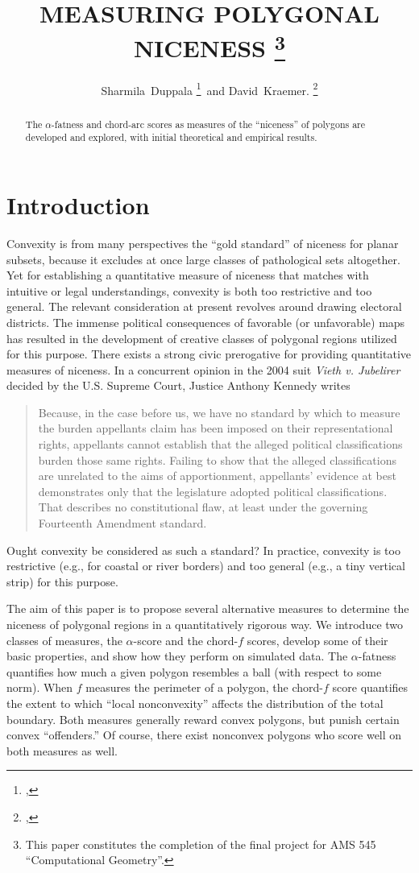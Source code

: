 \documentclass[]{jocg}
\title{%
  \MakeUppercase{Measuring polygonal niceness}%
  \thanks{%
    This paper constitutes the completion of the final project for AMS 545
    ``Computational Geometry''.
  }
}
\author{%
  Sharmila~Duppala%
  \thanks{%
    \affil{Department of Computer Science}, 
    \email{sduppala@cs.stonybrook.edu}%
  }\, and
  David~Kraemer.%
  \thanks{%
    \affil{Department of Applied Mathematics},
    \email{david.kraemer@stonybrook.edu}%
  }
}
\theoremstyle{definition}
\theoremstyle{remark}
\begin{document}
\maketitle

\begin{abstract}
  The $\alpha$-fatness and chord-arc scores as measures of the ``niceness'' of
  polygons are developed and explored, with initial theoretical and empirical
  results. 
\end{abstract}

\tableofcontents

\section{Introduction}

Convexity is from many perspectives the ``gold standard'' of niceness for planar
subsets, because it excludes at once large classes of pathological sets
altogether. Yet for establishing a quantitative measure of niceness that matches
with intuitive or legal understandings, convexity is both too restrictive and too
general. The relevant consideration at present revolves around drawing electoral
districts. The immense political consequences of favorable (or unfavorable)
maps has resulted in the development of creative classes of polygonal regions
utilized for this purpose. There exists a strong civic prerogative for providing
quantitative measures of niceness. In a concurrent opinion in the 2004 suit
\textit{Vieth v. Jubelirer} decided by the U.S. Supreme Court, Justice Anthony
Kennedy writes 
\begin{quote}
  Because, in the case before us, we have no standard by which to measure the
  burden appellants claim has been imposed on their representational rights,
  appellants cannot establish that the alleged political classifications burden
  those same rights.  Failing to show that the alleged classifications are
  unrelated to the aims of apportionment, appellants’ evidence at best
  demonstrates only that the legislature adopted political classifications. That
  describes no constitutional flaw, at least under the governing Fourteenth
  Amendment standard. \cite{2004vieth}
\end{quote}
Ought convexity be considered as such a standard? In practice, convexity is too
restrictive (e.g., for coastal or river borders) and too general (e.g., a tiny
vertical strip) for this purpose.

The aim of this paper is to propose several alternative measures to determine
the niceness of polygonal regions in a quantitatively rigorous way. We introduce
two classes of measures, the $\alpha$-score and the chord-$f$ scores, develop
some of their basic properties, and show how they perform on simulated data. The
$\alpha$-fatness quantifies how much a given polygon resembles a ball (with
respect to some norm). When $f$ measures the perimeter of a polygon, the
chord-$f$ score quantifies the extent to which ``local nonconvexity'' affects
the distribution of the total boundary. Both measures generally reward convex
polygons, but punish certain convex ``offenders.'' Of course, there exist
nonconvex polygons who score well on both measures as well.
\end{document}
